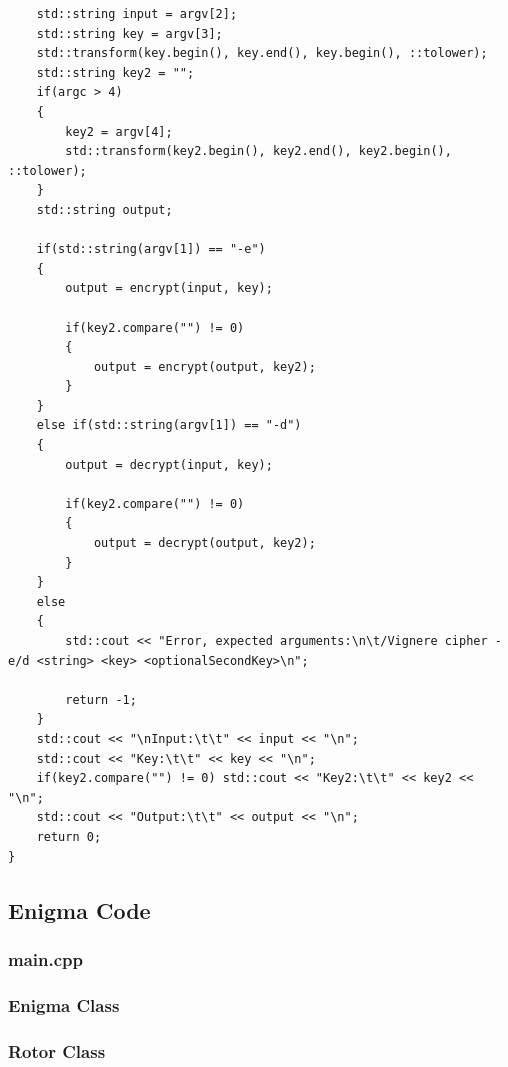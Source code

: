 \documentclass{article}
\begin{document}
\begin{lstlisting}
	std::string input = argv[2];
	std::string key = argv[3];
	std::transform(key.begin(), key.end(), key.begin(), ::tolower);
	std::string key2 = "";
	if(argc > 4)
	{	
		key2 = argv[4];
		std::transform(key2.begin(), key2.end(), key2.begin(), ::tolower);
	}
	std::string output;

	if(std::string(argv[1]) == "-e")
	{
		output = encrypt(input, key);

		if(key2.compare("") != 0)
		{
			output = encrypt(output, key2); 
		}
	}
	else if(std::string(argv[1]) == "-d")
	{
		output = decrypt(input, key);

		if(key2.compare("") != 0)
		{
			output = decrypt(output, key2);
		}
	}
	else
	{
		std::cout << "Error, expected arguments:\n\t/Vignere cipher -e/d <string> <key> <optionalSecondKey>\n";

		return -1;
	}
	std::cout << "\nInput:\t\t" << input << "\n";
	std::cout << "Key:\t\t" << key << "\n";
	if(key2.compare("") != 0) std::cout << "Key2:\t\t" << key2 << "\n";
	std::cout << "Output:\t\t" << output << "\n"; 
	return 0;
}
\end{lstlisting}

\subsection{Enigma Code}
\subsubsection{main.cpp}

\subsubsection{Enigma Class}

\subsubsection{Rotor Class}




\newpage

\nocite{*}



\end{document}
